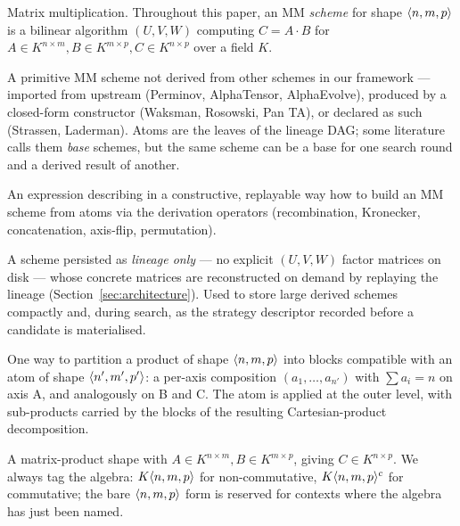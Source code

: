 \begin{description}[itemsep=4pt, leftmargin=2em]

  \item[MM.] Matrix multiplication. Throughout this paper, an MM
    \emph{scheme} for shape \(\nmpshape{n}{m}{p}\) is a bilinear
    algorithm \((U, V, W)\) computing \(C = A \cdot B\) for
    \(A \in K^{n \times m}, B \in K^{m \times p}, C \in K^{n \times p}\)
    over a field \(K\).

  \item[Atom.] A primitive MM scheme not derived from other schemes
    in our framework --- imported from upstream (Perminov,
    AlphaTensor, AlphaEvolve), produced by a closed-form constructor
    (Waksman, Rosowski, Pan TA), or declared as such (Strassen,
    Laderman). Atoms are the leaves of the lineage DAG; some
    literature calls them \emph{base} schemes, but the same scheme
    can be a base for one search round and a derived result of
    another.

  \item[Lineage.] An expression describing in a constructive,
    replayable way how to build an MM scheme from atoms via the
    derivation operators (recombination, Kronecker, concatenation,
    axis-flip, permutation).

  \item[Stub.] A scheme persisted as \emph{lineage only} --- no explicit
    \((U, V, W)\) factor matrices on disk --- whose concrete matrices
    are reconstructed on demand by replaying the lineage
    (Section~\ref{sec:architecture}). Used to store large derived
    schemes compactly and, during search, as the strategy descriptor
    recorded before a candidate is materialised.

  \item[Allocation.] One way to partition a product of shape
    \(\nmpshape{n}{m}{p}\) into blocks compatible with an atom of
    shape \(\langle n', m', p' \rangle\): a per-axis composition
    \((a_1, \ldots, a_{n'})\) with \(\sum a_i = n\) on axis A, and
    analogously on B and C. The atom is applied at the outer level,
    with sub-products carried by the blocks of the resulting
    Cartesian-product decomposition.

  \item[Shape \(\nmpshape{n}{m}{p}\).] A matrix-product shape with
    \(A \in K^{n \times m}, B \in K^{m \times p}\), giving
    \(C \in K^{n \times p}\). We always tag the algebra:
    \(K\langle n, m, p \rangle\) for non-commutative,
    \(K\langle n, m, p \rangle^c\) for commutative; the bare
    \(\nmpshape{n}{m}{p}\) form is reserved for contexts where the
    algebra has just been named.


\end{description}
